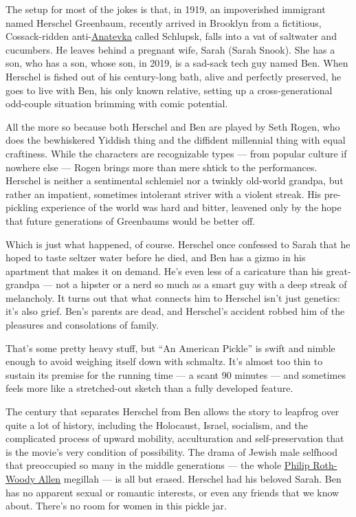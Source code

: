 The setup for most of the jokes is that, in 1919, an impoverished
immigrant named Herschel Greenbaum, recently arrived in Brooklyn from a
fictitious, Cossack-ridden
anti-\href{https://www.youtube.com/watch?v=F9E_PTTHvgI}{Anatevka} called
Schlupsk, falls into a vat of saltwater and cucumbers. He leaves behind
a pregnant wife, Sarah (Sarah Snook). She has a son, who has a son,
whose son, in 2019, is a sad-sack tech guy named Ben. When Herschel is
fished out of his century-long bath, alive and perfectly preserved, he
goes to live with Ben, his only known relative, setting up a
cross-generational odd-couple situation brimming with comic potential.

All the more so because both Herschel and Ben are played by Seth Rogen,
who does the bewhiskered Yiddish thing and the diffident millennial
thing with equal craftiness. While the characters are recognizable types
--- from popular culture if nowhere else --- Rogen brings more than mere
shtick to the performances. Herschel is neither a sentimental schlemiel
nor a twinkly old-world grandpa, but rather an impatient, sometimes
intolerant striver with a violent streak. His pre-pickling experience of
the world was hard and bitter, leavened only by the hope that future
generations of Greenbaums would be better off.

Which is just what happened, of course. Herschel once confessed to Sarah
that he hoped to taste seltzer water before he died, and Ben has a gizmo
in his apartment that makes it on demand. He's even less of a caricature
than his great-grandpa --- not a hipster or a nerd so much as a smart
guy with a deep streak of melancholy. It turns out that what connects
him to Herschel isn't just genetics: it's also grief. Ben's parents are
dead, and Herschel's accident robbed him of the pleasures and
consolations of family.

That's some pretty heavy stuff, but ``An American Pickle'' is swift and
nimble enough to avoid weighing itself down with schmaltz. It's almost
too thin to sustain its premise for the running time --- a scant 90
minutes --- and sometimes feels more like a stretched-out sketch than a
fully developed feature.

The century that separates Herschel from Ben allows the story to
leapfrog over quite a lot of history, including the Holocaust, Israel,
socialism, and the complicated process of upward mobility, acculturation
and self-preservation that is the movie's very condition of possibility.
The drama of Jewish male selfhood that preoccupied so many in the middle
generations --- the whole
\href{https://slate.com/culture/2001/08/the-estranged-twins.html}{Philip
Roth-Woody Allen} megillah --- is all but erased. Herschel had his
beloved Sarah. Ben has no apparent sexual or romantic interests, or even
any friends that we know about. There's no room for women in this pickle
jar.

